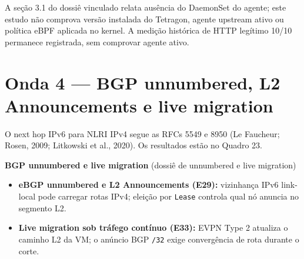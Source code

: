 \documentclass[12pt,openany,oneside,a4paper,chapter=TITLE,english,brazil]{abntex2}
\providecommand{\tightlist}{\setlength{\itemsep}{0pt}\setlength{\parskip}{0pt}}
\begin{document}
A seção 3.1 do dossiê vinculado relata ausência do DaemonSet do agente; este estudo não comprova versão instalada do Tetragon, agente upstream ativo ou política eBPF aplicada no kernel. A medição histórica de HTTP legítimo 10/10 permanece registrada, sem comprovar agente ativo.

\section{Onda 4 --- BGP unnumbered, L2 Announcements e live migration}\label{onda-4-bgp-unnumbered-l2-announcements-e-live-migration}

O next hop IPv6 para NLRI IPv4 segue as RFCs 5549 e 8950 (Le Faucheur; Rosen, 2009; Litkowski et al., 2020). Os resultados estão no Quadro 23.

\textbf{BGP unnumbered e live migration} (dossiê de unnumbered e live migration)

\begin{itemize}
\tightlist
\item
  \textbf{eBGP unnumbered e L2 Announcements (E29):} vizinhança IPv6 link-local pode carregar rotas IPv4; eleição por \texttt{Lease} controla qual nó anuncia no segmento L2.
\item
  \textbf{Live migration sob tráfego contínuo (E33):} EVPN Type 2 atualiza o caminho L2 da VM; o anúncio BGP \texttt{/\allowbreak{}32} exige convergência de rota durante o corte.
\end{itemize}
\end{document}
